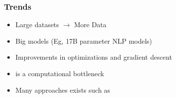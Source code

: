 \documentclass{beamer}
\begin{document}
\begin{frame}
\begin{figure}[ht!]
    \end{figure}
    
\end{frame}
\begin{frame}
    \frametitle{Trends}
    \begin{itemize}
        \item Large datasets $\rightarrow$ More Data
        \item Big models (Eg, 17B parameter NLP models)
        \item Improvements in optimizations and gradient descent
        \item {} is a computational bottleneck
        \item Many approaches exists such as 
    \end{itemize}

\end{frame}
\end{document}
